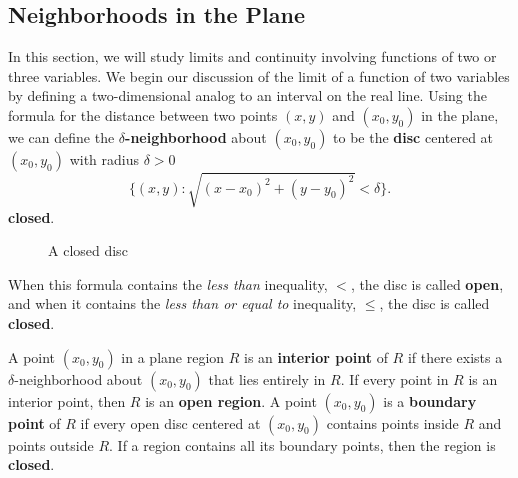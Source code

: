 \documentclass[titlepage,a4paper,12pt]{report}
\begin{document}
\subsection{Neighborhoods in the Plane}
In this section, we will study limits and continuity involving functions of two or three variables. We begin our discussion of the limit of a function of two variables by defining a two-dimensional analog to an interval on the real line. Using the formula for the distance between two points $(x,y)$ and $(x_0, y_0)$ in the plane, we can define the \textbf{$\delta$-neighborhood} about $(x_0,y_0)$ to be the \textbf{disc} centered at $(x_0,y_0)$ with radius $\delta >0$
\[\{(x,y): \sqrt{(x-x_0)^2+(y-y_0)^2}< \delta\}.\] 
\textbf{closed}.
\begin{figure}[h!]

\caption{A closed disc}
\end{figure}
When this formula contains the \textit{less than} inequality, $<$, the disc is called \textbf{open}, and when it contains the \textit{less than or equal to} inequality, $\leq$, the disc is called \textbf{closed}. 

\noindent A point $(x_0, y_0)$ in a plane region $R$ is an \textbf{interior point} of $R$ if there exists a $\delta$-neighborhood about $(x_0, y_0)$ that lies entirely in $R$. If every point in $R$ is an interior point, then $R$ is an \textbf{open region}. A point $(x_0, y_0)$ is a \textbf{boundary point} of $R$ if every open disc centered at $(x_0, y_0)$ contains points inside $R$ and points outside $R$. If a region contains all its boundary points, then the region is \textbf{closed}.
\end{document}

